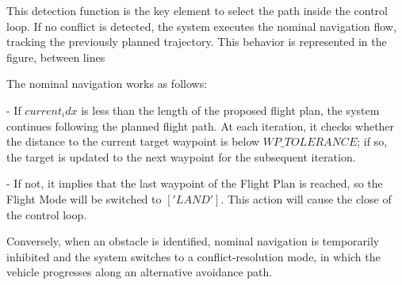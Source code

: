 \documentclass[a4paper, 11pt]{article}
\begin{document}
This detection function is the key element to select the path inside the control loop. If no conflict is detected, the system executes the nominal navigation flow, tracking the previously planned trajectory. This behavior is represented in the figure, between lines %

The nominal navigation works as follows: 

- If $current_idx$ is less than the length of the proposed flight plan, the system continues following the planned flight path. At each iteration, it checks whether the distance to the current target waypoint is below $WP\_TOLERANCE$; if so, the target is updated to the next waypoint for the subsequent iteration.

- If not, it implies that the last waypoint of the Flight Plan is reached, so the Flight Mode will be switched to $['LAND']$. This action will cause the close of the control loop.

Conversely, when an obstacle is identified, nominal navigation is temporarily inhibited and the system switches to a conflict-resolution mode, in which the vehicle progresses along an alternative avoidance path.


\end{document}
